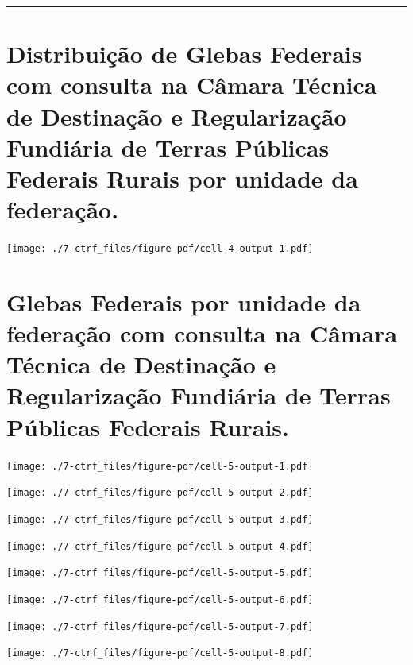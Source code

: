 \documentclass[
  letterpaper,
]{report}
\begin{document}
\begin{center}\rule{0.5\linewidth}{0.5pt}\end{center}

\hypertarget{distribuiuxe7uxe3o-de-glebas-federais-com-consulta-na-cuxe2mara-tuxe9cnica-de-destinauxe7uxe3o-e-regularizauxe7uxe3o-fundiuxe1ria-de-terras-puxfablicas-federais-rurais-por-unidade-da-federauxe7uxe3o.}{%
\section{Distribuição de Glebas Federais com consulta na Câmara Técnica
de Destinação e Regularização Fundiária de Terras Públicas Federais
Rurais por unidade da
federação.}\label{distribuiuxe7uxe3o-de-glebas-federais-com-consulta-na-cuxe2mara-tuxe9cnica-de-destinauxe7uxe3o-e-regularizauxe7uxe3o-fundiuxe1ria-de-terras-puxfablicas-federais-rurais-por-unidade-da-federauxe7uxe3o.}}

\texttt{[image: ./7-ctrf\_files/figure-pdf/cell-4-output-1.pdf]}

\hypertarget{glebas-federais-por-unidade-da-federauxe7uxe3o-com-consulta-na-cuxe2mara-tuxe9cnica-de-destinauxe7uxe3o-e-regularizauxe7uxe3o-fundiuxe1ria-de-terras-puxfablicas-federais-rurais.}{%
\section{Glebas Federais por unidade da federação com consulta na Câmara
Técnica de Destinação e Regularização Fundiária de Terras Públicas
Federais
Rurais.}\label{glebas-federais-por-unidade-da-federauxe7uxe3o-com-consulta-na-cuxe2mara-tuxe9cnica-de-destinauxe7uxe3o-e-regularizauxe7uxe3o-fundiuxe1ria-de-terras-puxfablicas-federais-rurais.}}

\texttt{[image: ./7-ctrf\_files/figure-pdf/cell-5-output-1.pdf]}

\texttt{[image: ./7-ctrf\_files/figure-pdf/cell-5-output-2.pdf]}

\texttt{[image: ./7-ctrf\_files/figure-pdf/cell-5-output-3.pdf]}

\texttt{[image: ./7-ctrf\_files/figure-pdf/cell-5-output-4.pdf]}

\texttt{[image: ./7-ctrf\_files/figure-pdf/cell-5-output-5.pdf]}

\texttt{[image: ./7-ctrf\_files/figure-pdf/cell-5-output-6.pdf]}

\texttt{[image: ./7-ctrf\_files/figure-pdf/cell-5-output-7.pdf]}

\texttt{[image: ./7-ctrf\_files/figure-pdf/cell-5-output-8.pdf]}
\end{document}
